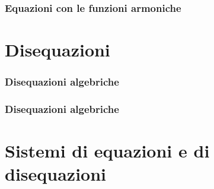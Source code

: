 \subsection{Equazioni con le funzioni armoniche}


\chapter{Disequazioni}
\subsection{Disequazioni algebriche}
\subsection{Disequazioni algebriche}

\chapter{Sistemi di equazioni e di disequazioni}



